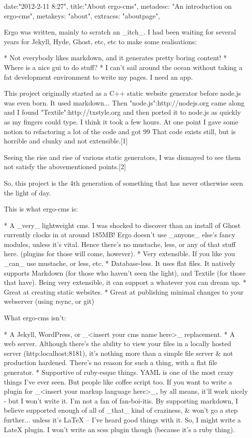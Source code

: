 {
date:"2012-2-11 8:27",
title:"About ergo-cms",
metadesc: "An introduction on ergo-cms",
metakeys: "about",
extracss: "aboutpage",
}

Ergo was written, mainly to scratch an _itch_. I had been waiting for several years for Jekyll, Hyde, Ghost, etc, etc to make some realisations:

* Not everybody likes markdown, and it generates pretty boring content!
* Where is a nice gui to do stuff?
* I can't sail around the ocean without taking a fat development environment to write my pages. I need an app.

This project originally started as a C++ static website generator before node.js was even born. It used markdown... 
Then "node.js":http://nodejs.org came along and I found "Textile":http://txstyle.org and then ported it to node.js as quickly as my fingers could type. I think it took a few hours. 
At one point I gave some notion to refactoring a lot of the code and got 99%
That code exists still, but is horrible and clunky and not extensible.[1]

Seeing the rise and rise of various static generators, I was dismayed to see them not satisfy the abovementioned points.[2]

So, this project is the 4th generation of something that has never otherwise seen the light of day.


This is what ergo-cms is:

* A _very_ lightweight cms. I was shocked to discover than an install of Ghost currently clocks in at around 185MB! Ergo doesn't use _anyone_ else's fancy modules, unless it's vital. Hence there's no mustache, less, or any of that stuff here. (plugins for those will come, however).
* Very extensible. If you like you _can_ use mustache, or less, etc.
* Database-less. It uses flat files. It natively supports Markdown (for those who haven't seen the light), and Textile (for those that have). Being very extensible, it can support a whatever you can dream up.
* Great at creating static websites. 
* Great at publishing minimal changes to your webserver (using rsync, or git)


What ergo-cms isn't:

* A Jekyll, WordPress, or _<insert your cms name here>_ replacement.
* A web server. Although there's the ability to view your files in a locally hosted server (http:localhost:8181), it's nothing more than a simple file server & not production hardened. There's no reason for such a thing, with a flat file generator.
* Supportive of ruby-esque things. YAML is one of the most crazy things I've ever seen. But people like coffee script too. If you want to write a plugin for _<insert your markup language here>_, by all means, it'll work nicely - but I won't write it. I'm not a fan of fan-boi-itis. By supporting markdown, I believe supported enough of all of _that_ kind of craziness, & won't go a step further... unless it's LaTeX -- I've heard good things with it. So, I might write a LateX plugin. I won't write an scss plugin though (because it's a ruby thing).

